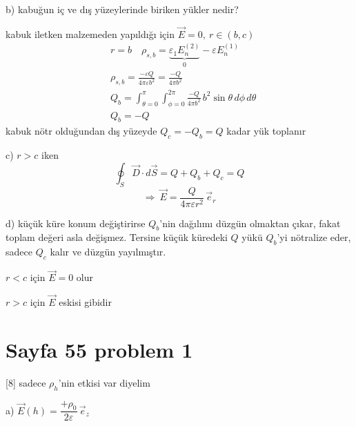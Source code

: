 \documentclass[11pt,a4paper]{article}
\begin{document}
b) kabuğun iç ve dış yüzeylerinde biriken yükler nedir?

kabuk iletken malzemeden yapıldığı için $\vec E=0,\ r\in(b,c)$
\begin{align*}
&r=b\quad \rho_{s,b}=\underbrace{\varepsilon_1E_n^{(2)}}_{0}-\varepsilon E_n^{(1)}\\
&\rho_{s,b}=\frac{-\varepsilon Q}{4\pi\varepsilon b^2}=\frac{-Q}{4\pi b^2}\\
&Q_b=\int_{\theta=0}^{\pi}\int_{\phi=0}^{2\pi}\frac{-Q}{4\pi b^2}\,b^2\sin\theta\,d\phi\,d\theta\\
&Q_b=-Q
\end{align*}
kabuk nötr olduğundan dış yüzeyde $Q_c=-Q_b=Q$ kadar yük toplanır

c) $r>c$ iken
\[ \oint_S\vec D\cdot d\vec S=Q+Q_b+Q_c=Q \]
\[ \Rightarrow\ \vec E=\frac{Q}{4\pi\varepsilon r^2}\,\vec e_r \]

d) küçük küre konum değiştirirse $Q_b$'nin dağılımı düzgün olmaktan çıkar, fakat toplam değeri asla değişmez. Tersine küçük küredeki $Q$ yükü $Q_b$'yi nötralize eder, sadece $Q_c$ kalır ve düzgün yayılmıştır.

$r<c$ için $\vec E=0$ olur

$r>c$ için $\vec E$ eskisi gibidir

\section{Sayfa 55 problem 1}
[8]
sadece $\rho_h$'nin etkisi var diyelim

a) \qquad $\vec E(h)=\dfrac{+\rho_0}{2\varepsilon}\,\vec e_z$
\end{document}
